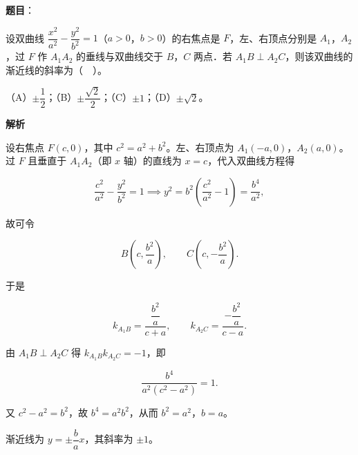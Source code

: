 \begin{answer}

\textbf{题目}：

设双曲线 $\dfrac{x^{2}}{a^{2}}-\dfrac{y^{2}}{b^{2}}=1$（$a>0$，$b>0$）的右焦点是 $F$，左、右顶点分别是 $A_{1}$，$A_{2}$，过 $F$ 作 $A_{1}A_{2}$ 的垂线与双曲线交于 $B$，$C$ 两点．若 $A_{1}B\perp A_{2}C$，则该双曲线的渐近线的斜率为（　）。

（A）$\pm\dfrac{1}{2}$；（B）$\pm\dfrac{\sqrt{2}}{2}$；（C）$\pm1$；（D）$\pm\sqrt{2}$。

\textbf{解析}

设右焦点 $F(c,0)$，其中 $c^{2}=a^{2}+b^{2}$。左、右顶点为 $A_{1}(-a,0)$，$A_{2}(a,0)$。过 $F$ 且垂直于 $A_{1}A_{2}$（即 $x$ 轴）的直线为 $x=c$，代入双曲线方程得

\nopagebreak[4]
\[
\frac{c^{2}}{a^{2}}-\frac{y^{2}}{b^{2}}=1
\implies
y^{2}=b^{2}\left(\frac{c^{2}}{a^{2}}-1\right)
=\frac{b^{4}}{a^{2}},
\]

故可令

\nopagebreak[4]
\[
B\left(c,\frac{b^{2}}{a}\right),\qquad C\left(c,-\frac{b^{2}}{a}\right).
\]

于是

\nopagebreak[4]
\[
k_{A_{1}B}=\frac{\dfrac{b^{2}}{a}}{c+a},\qquad
k_{A_{2}C}=\frac{-\dfrac{b^{2}}{a}}{c-a}.
\]

由 $A_{1}B\perp A_{2}C$ 得 $k_{A_{1}B}k_{A_{2}C}=-1$，即

\nopagebreak[4]
\[
\frac{b^{4}}{a^{2}(c^{2}-a^{2})}=1.
\]

又 $c^{2}-a^{2}=b^{2}$，故 $b^{4}=a^{2}b^{2}$，从而 $b^{2}=a^{2}$，$b=a$。

渐近线为 $y=\pm\dfrac{b}{a}x$，其斜率为 $\pm1$。


\end{answer}
